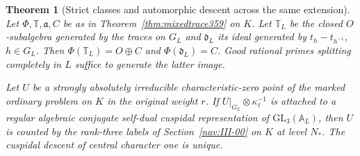 \documentclass[a4paper,11pt]{article}
\newtheorem{theorem}[proposition]{Theorem}
\theoremstyle{definition}
\theoremstyle{remark}
\numberwithin{equation}{section}
\begin{document}
\begin{theorem}[Strict classes and automorphic descent across the same extension]
\label{thm:auxdescent361}
Let \(\Phi,\mathbb T,\mathfrak a,C\) be as in
Theorem~\ref{thm:mixedtrace359} on \(K\).
Let \(\mathbb T_L\) be the closed \(O\)-subalgebra generated by
the traces on \(G_L\) and \(\mathfrak d_L\) its ideal generated
by \(t_h-t_{h^{-1}}\), \(h\in G_L\).
Then \(\Phi(\mathbb T_L)=O\oplus C\) and
\(\Phi(\mathfrak d_L)=C\). Good rational primes splitting
completely in \(L\) suffice to generate the latter image.

Let \(U\) be a strongly absolutely irreducible characteristic-zero
point of the marked ordinary problem on \(K\) in the original
weight \(r\). If \(U|_{G_L}\otimes\kappa_\ell^{-1}\) is attached
to a regular algebraic conjugate self-dual cuspidal representation
of \(\mathrm{GL}_3(\mathbb A_L)\), then \(U\) is counted by the
rank-three labels of Section~\ref{nav:III-00} on \(K\) at level
\(N_*\). The cuspidal descent of central character one is unique.
\end{theorem}
\end{document}
